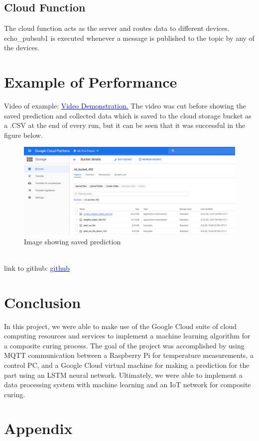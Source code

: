 \documentclass{article}
\begin{document}
\subsection{Cloud Function}
The cloud function acts as the server and routes data to different devices. echo\_pubsub1 is executed whenever a message is published to the topic by any of the devices. 


\section{Example of Performance} \label{example_perf}
Video of example: \href{https://www.youtube.com/watch?v=iKukfWf5Yn0&feature=youtu.be}{\textcolor{blue}{\underline{Video Demonstration.}}}
The video was cut before showing the saved prediction and collected data which is saved to the cloud storage bucket as a .CSV at the end of every run, but it can be seen that it was successful in the figure below.
\begin{figure}[h]
    \centering
    \includegraphics[width=.5\linewidth]{iot.png}
    \caption{Image showing saved prediction}
    \label{fig:iot_bucket}
\end{figure}
\\
link to github: \href{https://github.com/gaapaul/IotClassProject/tree/master/class_project}{\textcolor{blue}{\underline{github}}}
\section{Conclusion}
In this project, we were able to make use of the Google Cloud suite of cloud computing resources and services to implement a machine learning algorithm for a composite curing process. The goal of the project was accomplished by using MQTT communication between a Raspberry Pi for temperature measurements, a control PC, and a Google Cloud virtual machine for making a prediction for the part using an LSTM neural network. Ultimately, we were able to implement a data processing system with machine learning and an IoT network for composite curing.  
\section{Appendix}
\end{document}
